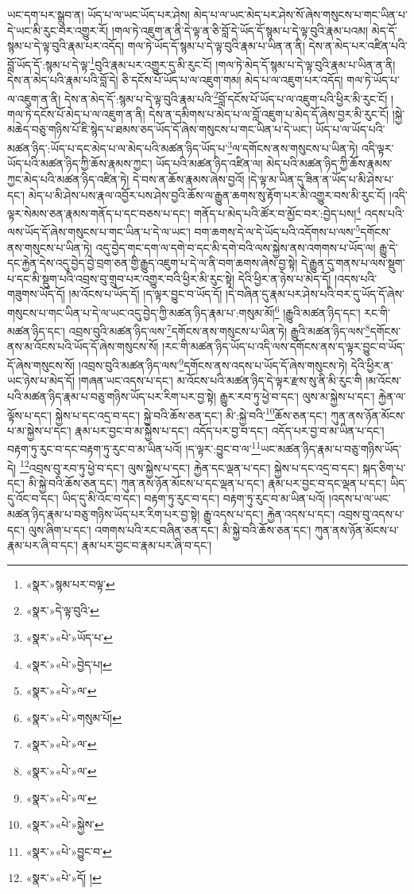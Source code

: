 ཡང་དག་པར་སྒྲུབ་ན། ཡོད་པ་ལ་ཡང་ཡོད་པར་ཤེས། མེད་པ་ལ་ཡང་མེད་པར་ཤེས་སོ་ཞེས་གསུངས་པ་གང་ཡིན་པ་དེ་ཡང་མི་རུང་བར་འགྱུར་རོ། །གལ་ཏེ་འཇུག་ན་ནི་དེ་ལྟ་ན་ཅི་བློ་དེ་ཡོད་དོ་སྙམ་པ་དེ་ལྟ་བུའི་རྣམ་པའམ། མེད་དོ་སྙམ་པ་དེ་ལྟ་བུའི་རྣམ་པར་འདོད། གལ་ཏེ་ཡོད་དོ་སྙམ་པ་དེ་ལྟ་བུའི་རྣམ་པ་ཡིན་ན་ནི། དེས་ན་མེད་པར་འཛིན་པའི་བློ་ཡོད་དོ་:སྙམ་པ་དེ་ལྟ་\footnote{«སྣར་»སྙམ་པར་བལྟ་}བུའི་རྣམ་པར་འགྱུར་དུ་མི་རུང་ངོ། །གལ་ཏེ་མེད་དོ་སྙམ་པ་དེ་ལྟ་བུའི་རྣམ་པ་ཡིན་ན་ནི། དེས་ན་མེད་པའི་རྣམ་པའི་བློ་དེ། ཅི་དངོས་པོ་ཡོད་པ་ལ་འཇུག་གམ། མེད་པ་ལ་འཇུག་པར་འདོད། གལ་ཏེ་ཡོད་པ་ལ་འཇུག་ན་ནི། དེས་ན་མེད་དོ་:སྙམ་པ་དེ་ལྟ་བུའི་རྣམ་པའི་\footnote{«སྣར་»དེ་ལྟ་བུའི་}བློ་དངོས་པོ་ཡོད་པ་ལ་འཇུག་པའི་ཕྱིར་མི་རུང་ངོ། །གལ་ཏེ་དངོས་པོ་མེད་པ་ལ་འཇུག་ན་ནི། དེས་ན་དམིགས་པ་མེད་པ་ལ་བློ་འཇུག་པ་མེད་དོ་ཞེས་བྱར་མི་རུང་ངོ། །སྐྱེ་མཆེད་བཅུ་གཉིས་པོ་ཇི་སྙེད་པ་ཐམས་ཅད་ཡོད་དོ་ཞེས་གསུངས་པ་གང་ཡིན་པ་དེ་ཡང་། ཡོད་པ་ལ་ཡོད་པའི་མཚན་ཉིད་:ཡོད་པ་དང་མེད་པ་ལ་མེད་པའི་མཚན་ཉིད་ཡོད་པ་\footnote{«སྣར་»«པེ་»ཡོད་པ་}ལ་དགོངས་ནས་གསུངས་པ་ཡིན་ཏེ། འདི་ལྟར་ཡོད་པའི་མཚན་ཉིད་ཀྱི་ཆོས་རྣམས་ཀྱང་། ཡོད་པའི་མཚན་ཉིད་འཛིན་ལ། མེད་པའི་མཚན་ཉིད་ཀྱི་ཆོས་རྣམས་ཀྱང་མེད་པའི་མཚན་ཉིད་འཛིན་ཏེ། དེ་བས་ན་ཆོས་རྣམས་ཞེས་བྱའོ། །དེ་ལྟ་མ་ཡིན་དུ་ཟིན་ན་ཡོད་པ་མི་ཤེས་པ་དང་། མེད་པ་མི་ཤེས་པས་རྣལ་འབྱོར་པས་ཤེས་བྱའི་ཆོས་ལ་རྒྱུན་ཆགས་སུ་རྟོག་པར་མི་འགྱུར་བས་མི་རུང་ངོ། །འདི་ལྟར་སེམས་ཅན་རྣམས་གནོད་པ་དང་བཅས་པ་དང་། གནོད་པ་མེད་པའི་ཚོར་བ་མྱོང་བར་:བྱེད་པས།\footnote{«སྣར་»«པེ་»བྱེད་པ།} འདས་པའི་ལས་ཡོད་དོ་ཞེས་གསུངས་པ་གང་ཡིན་པ་དེ་ལ་ཡང་། བག་ཆགས་དེ་ལ་དེ་ཡོད་པའི་འདོགས་པ་ལས་\footnote{«སྣར་»«པེ་»ལ་}དགོངས་ནས་གསུངས་པ་ཡིན་ཏེ། འདུ་བྱེད་གང་དག་ལ་དགེ་བ་དང་མི་དགེ་བའི་ལས་སྐྱེས་ནས་འགགས་པ་ཡོད་ལ། རྒྱུ་དེ་དང་རྐྱེན་དེས་འདུ་བྱེད་བྱེ་བྲག་ཅན་གྱི་རྒྱུད་འཇུག་པ་དེ་ལ་ནི་བག་ཆགས་ཞེས་བྱ་སྟེ། དེ་རྒྱུན་དུ་གནས་པ་ལས་སྡུག་པ་དང་མི་སྡུག་པའི་འབྲས་བུ་གྲུབ་པར་འགྱུར་བའི་ཕྱིར་མི་རུང་སྟེ། དེའི་ཕྱིར་ན་ཉེས་པ་མེད་དོ། །འདས་པའི་གཟུགས་ཡོད་དོ། །མ་འོངས་པ་ཡོད་དོ། །ད་ལྟར་བྱུང་བ་ཡོད་དོ། །དེ་བཞིན་དུ་རྣམ་པར་ཤེས་པའི་བར་དུ་ཡོད་དོ་ཞེས་གསུངས་པ་གང་ཡིན་པ་དེ་ལ་ཡང་འདུ་བྱེད་ཀྱི་མཚན་ཉིད་རྣམ་པ་:གསུམ་མོ།\footnote{«སྣར་»«པེ་»གསུམ་པོ།} །རྒྱུའི་མཚན་ཉིད་དང་། རང་གི་མཚན་ཉིད་དང་། འབྲས་བུའི་མཚན་ཉིད་ལས་\footnote{«སྣར་»«པེ་»ལ་}དགོངས་ནས་གསུངས་པ་ཡིན་ཏེ། རྒྱུའི་མཚན་ཉིད་ལས་\footnote{«སྣར་»«པེ་»ལ་}དགོངས་ནས་མ་འོངས་པའི་ཡོད་དོ་ཞེས་གསུངས་སོ། །རང་གི་མཚན་ཉིད་ཡོད་པ་འདི་ལས་དགོངས་ནས་ད་ལྟར་བྱུང་བ་ཡོད་དོ་ཞེས་གསུངས་སོ། །འབྲས་བུའི་མཚན་ཉིད་ལས་\footnote{«སྣར་»«པེ་»ལ་}དགོངས་ནས་འདས་པ་ཡོད་དོ་ཞེས་གསུངས་ཏེ། དེའི་ཕྱིར་ན་ཡང་ཉེས་པ་མེད་དོ། །གཞན་ཡང་འདས་པ་དང་། མ་འོངས་པའི་མཚན་ཉིད་དེ་ལྟར་རྫས་སུ་ནི་མི་རུང་གི །མ་འོངས་པའི་མཚན་ཉིད་རྣམ་པ་བཅུ་གཉིས་ཡོད་པར་རིག་པར་བྱ་སྟེ། རྒྱུར་རབ་ཏུ་ཕྱེ་བ་དང་། ལུས་མ་སྐྱེས་པ་དང་། རྐྱེན་ལ་ལྟོས་པ་དང་། སྐྱེས་པ་དང་འདྲ་བ་དང་། སྐྱེ་བའི་ཆོས་ཅན་དང་། མི་:སྐྱེ་བའི་\footnote{«སྣར་»«པེ་»སྐྱེས་}ཆོས་ཅན་དང་། ཀུན་ནས་ཉོན་མོངས་པ་མ་སྐྱེས་པ་དང་། རྣམ་པར་བྱང་བ་མ་སྐྱེས་པ་དང་། འདོད་པར་བྱ་བ་དང་། འདོད་པར་བྱ་བ་མ་ཡིན་པ་དང་། བརྟག་ཏུ་རུང་བ་དང་བརྟག་ཏུ་རུང་བ་མ་ཡིན་པའོ། །ད་ལྟར་:བྱུང་བ་ལ་\footnote{«སྣར་»«པེ་»བྱུང་བ་}ཡང་མཚན་ཉིད་རྣམ་པ་བཅུ་གཉིས་ཡོད་དེ། \footnote{«སྣར་»«པེ་»དོ། ། }འབྲས་བུ་རབ་ཏུ་ཕྱེ་བ་དང་། ལུས་སྐྱེས་པ་དང་། རྐྱེན་དང་ལྡན་པ་དང་། སྐྱེས་པ་དང་འདྲ་བ་དང་། སྐད་ཅིག་པ་དང་། མི་སྐྱེ་བའི་ཆོས་ཅན་དང་། ཀུན་ནས་ཉོན་མོངས་པ་དང་ལྡན་པ་དང་། རྣམ་པར་བྱང་བ་དང་ལྡན་པ་དང་། ཡིད་དུ་འོང་བ་དང་། ཡིད་དུ་མི་འོང་བ་དང་། བརྟག་ཏུ་རུང་བ་དང་། བརྟག་ཏུ་རུང་བ་མ་ཡིན་པའོ། །འདས་པ་ལ་ཡང་མཚན་ཉིད་རྣམ་པ་བཅུ་གཉིས་ཡོད་པར་རིག་པར་བྱ་སྟེ། རྒྱུ་འདས་པ་དང་། རྐྱེན་འདས་པ་དང་། འབྲས་བུ་འདས་པ་དང་། ལུས་ཞིག་པ་དང་། འགགས་པའི་རང་བཞིན་ཅན་དང་། མི་སྐྱེ་བའི་ཆོས་ཅན་དང་། ཀུན་ནས་ཉོན་མོངས་པ་རྣམ་པར་ཞི་བ་དང་། རྣམ་པར་བྱང་བ་རྣམ་པར་ཞི་བ་དང་། 
